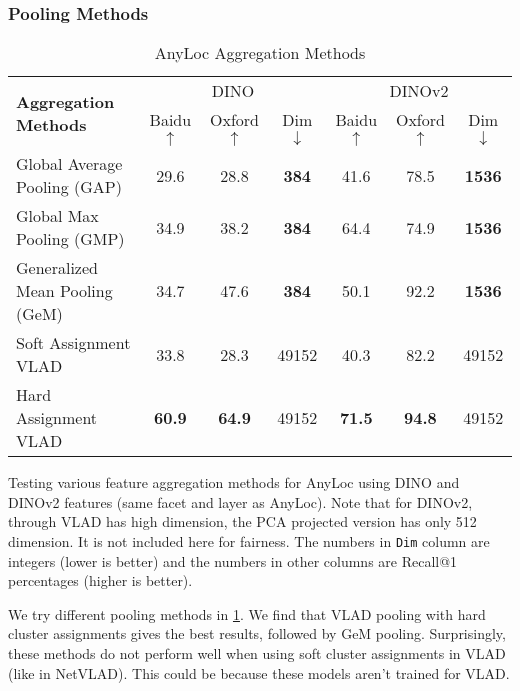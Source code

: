 \subsubsection{Pooling Methods}

\begin{table}
    \centering
    \begin{tabular}{|l|ccc|ccc|}
        \hline
        \multirow{2}{*}{\textbf{Aggregation Methods}} & 
            \multicolumn{3}{c|}{DINO} & \multicolumn{3}{c|}{DINOv2} \\
        & {\color{IndoorDark} Baidu $\uparrow$} & 
        {\color{OutdoorDark} Oxford $\uparrow$} & Dim $\downarrow$ & 
            {\color{IndoorDark} Baidu $\uparrow$} & 
        {\color{OutdoorDark} Oxford $\uparrow$} & Dim $\downarrow$ \\
        \hline
        Global Average Pooling (GAP) & 29.6 & 28.8 & \textbf{384} & 
            41.6 & 78.5 & \textbf{1536} \\
        Global Max Pooling (GMP) & 34.9 & 38.2 & \textbf{384} & 64.4 &
            74.9 & \textbf{1536} \\
        Generalized Mean Pooling (GeM) & 34.7 & 47.6 & \textbf{384} &
            50.1 & 92.2 & \textbf{1536} \\
        Soft Assignment VLAD & 33.8 & 28.3 & 49152 & 40.3 & 82.2 &
            49152 \\
        Hard Assignment VLAD & \textbf{60.9} & \textbf{64.9} & 49152 &
            \textbf{71.5} & \textbf{94.8} & 49152 \\
        \hline
    \end{tabular}
    \caption{AnyLoc Aggregation Methods}
    \small
        Testing various feature aggregation methods for AnyLoc using
        DINO and DINOv2 features (same facet and layer as AnyLoc).
        Note that for DINOv2, through VLAD has high dimension, the PCA
        projected version has only 512 dimension. It is not included
        here for fairness. The numbers in \texttt{Dim} column are
        integers (lower is better) and the numbers in other columns
        are Recall@1 percentages (higher is better).
    \label{tab:anyloc_agg_ablation}
\end{table}

We try different pooling methods in \cref{tab:anyloc_agg_ablation}. We
find that VLAD pooling with hard cluster assignments gives the best
results, followed by GeM pooling. Surprisingly, these methods do not
perform well when using soft cluster assignments in VLAD (like in
NetVLAD). This could be because these models aren't trained for VLAD.

